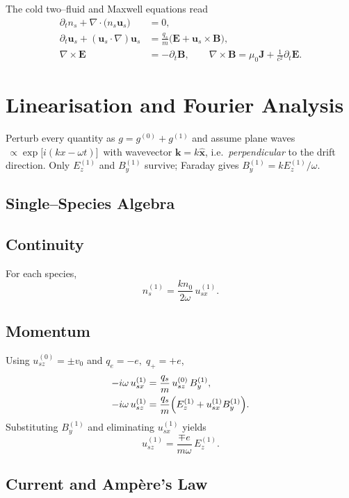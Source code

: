 The cold two--fluid and Maxwell equations read
\begin{align}
\partial_t n_s + \nabla\!\cdot\!\bigl(n_s\bm u_s\bigr) &= 0, \\
\partial_t \bm u_s + (\bm u_s\!\cdot\!\nabla)\bm u_s &= \frac{q_s}{m}
\bigl(\bm E + \bm u_s \times \bm B\bigr), \\
\nabla\times\bm E &= -\partial_t \bm B, \qquad
\nabla\times\bm B = \mu_0 \bm J + \frac{1}{c^{2}}\partial_t \bm E .
\end{align}

\section{Linearisation and Fourier Analysis}

Perturb every quantity as $g = g^{(0)} + g^{(1)}$ and assume plane waves
$\,\propto \exp\!\bigl[i(kx-\omega t)\bigr]\,$ with wavevector $\bm k = k\hat{\bm x}$, i.e.\ \emph{perpendicular} to the drift direction.
Only $E^{(1)}_z$ and $B^{(1)}_y$ survive; Faraday gives $B^{(1)}_y = kE^{(1)}_z/\omega$.

\subsection{Single--Species Algebra}

\subsection*{Continuity}

For each species,
\[
n^{(1)}_s = \frac{k n_0}{2\omega}\,u^{(1)}_{sx}.
\]

\subsection*{Momentum}

Using $u^{(0)}_{sz}=\pm v_0$ and $q_e=-e,\;q_+=+e$,
\begin{align}
-i\omega\,u^{(1)}_{sx} &= \frac{q_s}{m}\,u^{(0)}_{sz}\,B^{(1)}_y, \\
-i\omega\,u^{(1)}_{sz} &= \frac{q_s}{m}\Bigl(E^{(1)}_z + u^{(1)}_{sx} B^{(1)}_y\Bigr).
\end{align}
Substituting $B^{(1)}_y$ and eliminating $u^{(1)}_{sx}$ yields
\[
u^{(1)}_{sz} = \frac{\mp e}{m\omega}\,E^{(1)}_z .
\]

\subsection{Current and Amp\`ere's Law}

